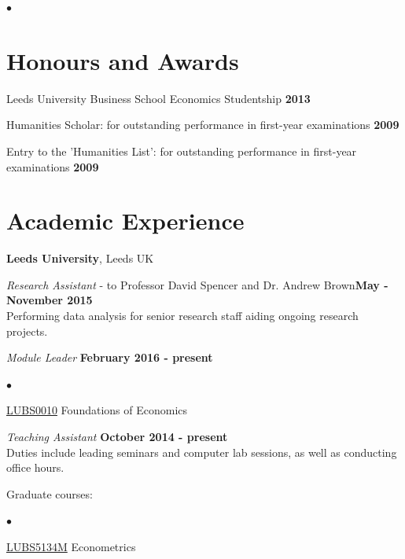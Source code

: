 \documentclass[margin,line]{res}
\newenvironment{list2}{
  \begin{list}{$\bullet$}{%
      \setlength{\itemsep}{0in}
      \setlength{\parsep}{0in} \setlength{\parskip}{0in}
      \setlength{\topsep}{0in} \setlength{\partopsep}{0in} 
      \setlength{\leftmargin}{0.2in}}}{\end{list}}
\begin{document}
\begin{resume}
\begin{list2}
\section{\sc Honours and Awards} 
Leeds University Business School Economics Studentship \hfill {\bf 2013}

\vspace*{-2.5mm}
Humanities Scholar: for outstanding performance in first-year examinations \hfill {\bf 2009}

\vspace*{-2.5mm}
Entry to the 'Humanities List': for outstanding performance in first-year examinations \hfill {\bf 2009}

\section{\sc Academic Experience}
{\bf Leeds University}, Leeds UK

\vspace{-.3cm}
{\em Research Assistant} - to Professor David Spencer and Dr. Andrew Brown\hfill {\bf May - November 2015}\\
Performing data analysis for senior research staff aiding ongoing research projects.

{\em Module Leader} \hfill {\bf February 2016  - present}\\

\vspace*{-.1in}
\begin{list2}
\item \href{http://webprod3.leeds.ac.uk/catalogue/dynmodules.asp?Y=201617&F=P&M=LUBS-0010}{LUBS0010} Foundations of Economics
\end{list2}


{\em Teaching Assistant} \hfill {\bf October 2014  - present}\\
Duties include leading seminars and computer lab sessions, as well as conducting office hours.

Graduate courses:\\ 
\vspace*{-.1in}
\begin{list2}
\item \href{http://webprod3.leeds.ac.uk/catalogue/dynmodules.asp?Y=201415&M=LUBS-5134M}{LUBS5134M} Econometrics
\end{list2}


\end{list2}
\end{resume}
\end{document}
